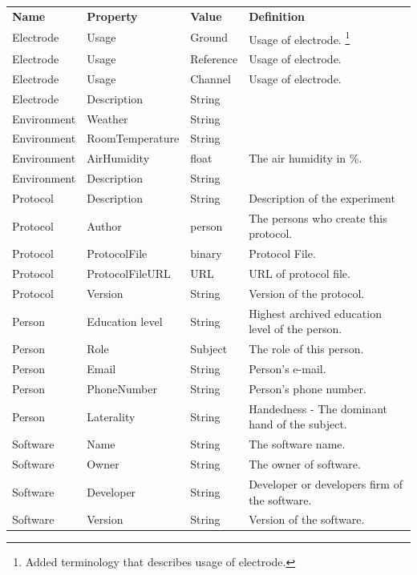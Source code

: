 \documentclass[conference]{IEEEtran}
\begin{document}
\begin{savenotes}
\begin{table}
 	\begin{tabular}{ | l | l | l | p{3cm} |}		
 	\hline
 \textbf{Name}& \textbf{Property} & \textbf{Value} & \textbf{Definition} \\
 	Electrode & Usage & Ground & Usage of electrode. \footnote{Added terminology that describes usage of electrode.}\\
 	\hline
 	Electrode & Usage & Reference&Usage of electrode.\footnotemark[\value{footnote}] \\
 	\hline
 	Electrode & Usage & Channel& Usage of electrode.\footnotemark[\value{footnote}]\\
 	\hline
 	Electrode & Description & String& \\
 	\hline		
 	Environment & Weather & String & \\
 	\hline	
 	Environment & RoomTemperature & String & \\
 	\hline
 	Environment & AirHumidity & float & The air humidity in \%.\\
 	\hline
 	Environment & Description & String &  \\
 	\hline
 	Protocol & Description & String & Description of the experiment\\
 	\hline
 	Protocol & Author & person & The persons who create this protocol.\\
 	\hline
 	Protocol & ProtocolFile & binary & Protocol File.\\
 	\hline
 	Protocol & ProtocolFileURL & URL & URL of protocol file.\\
 	\hline
 	Protocol & Version & String & Version of the protocol.\\
 	\hline
 	Person & Education level & String & Highest archived education level of the person.\\
 	\hline
 	Person & Role & Subject & The role of this person.\\
 	\hline
 	Person & Email & String & Person's e-mail.\\
 	\hline
 	Person & PhoneNumber & String & Person's phone number.\\
 	\hline
 	Person & Laterality & String & Handedness - The dominant hand of the subject.\\
 	\hline
 	Software & Name & String & The software name.\\
 	\hline
 	Software & Owner & String & The owner of software.\\
 	\hline
 	Software & Developer & String & Developer or developers firm of the software.\\
 	\hline
 	Software & Version & String & Version of the software.\\

\end{tabular}
\end{table}
\end{savenotes}
\end{document}
